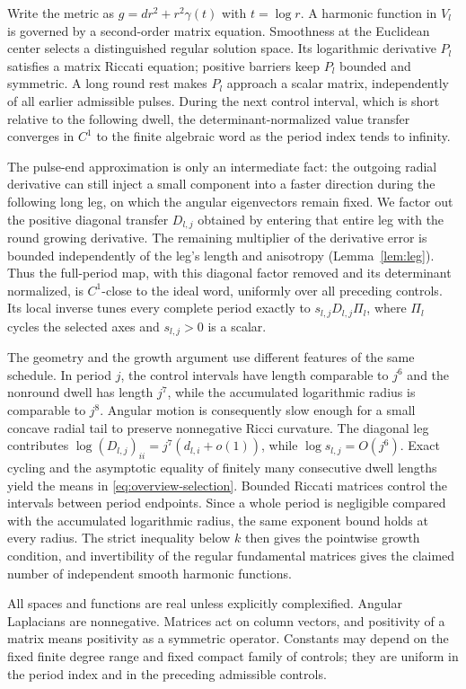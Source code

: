 Write the metric as $g=dr^2+r^2\gamma(t)$ with $t=\log r$. A harmonic
function in $V_l$ is governed by a second-order matrix equation. Smoothness
at the Euclidean center selects a distinguished regular solution space.
Its logarithmic derivative $P_l$ satisfies a matrix Riccati equation;
positive barriers keep $P_l$ bounded and symmetric. A long round rest makes
$P_l$ approach a scalar matrix, independently of all earlier admissible
pulses. During the next control interval, which is short relative to the
following dwell, the determinant-normalized value transfer converges in
$C^1$ to the finite algebraic word as the period index tends to infinity.

The pulse-end approximation is only an intermediate fact: the outgoing
radial derivative can still inject a small component into a faster direction
during the following long leg, on which the angular eigenvectors remain
fixed. We factor out the positive diagonal transfer \(D_{l,j}\) obtained by entering that entire leg with the round
growing derivative. The remaining multiplier of the derivative error is
bounded independently of the leg's length and anisotropy
(Lemma~\ref{lem:leg}). Thus the full-period map, with this diagonal
factor removed and its determinant normalized, is \(C^1\)-close to the ideal
word, uniformly over all preceding controls. Its local inverse tunes every complete period exactly to
\(s_{l,j}D_{l,j}\Pi_l\), where \(\Pi_l\) cycles the selected axes and
\(s_{l,j}>0\) is a scalar.

The geometry and the growth argument use different features of the same
schedule. In period $j$, the control intervals have length comparable to
$j^6$ and the nonround dwell has length $j^7$, while the accumulated
logarithmic radius is comparable to $j^8$. Angular motion is consequently
slow enough for a small concave radial tail to preserve nonnegative Ricci
curvature. The diagonal leg contributes
$\log(D_{l,j})_{ii}=j^7(d_{l,i}+o(1))$, while
$\log s_{l,j}=O(j^6)$. Exact cycling and the asymptotic equality of finitely
many consecutive dwell lengths yield the means in
\eqref{eq:overview-selection}. Bounded Riccati matrices control the intervals
between period endpoints. Since a whole period is negligible compared with
the accumulated logarithmic radius, the same exponent bound holds at every
radius. The strict inequality below $k$ then gives the pointwise growth
condition, and invertibility of the regular fundamental matrices gives the
claimed number of independent smooth harmonic functions.

All spaces and functions are real unless explicitly complexified. Angular
Laplacians are nonnegative. Matrices act on column vectors, and positivity of
a matrix means positivity as a symmetric operator. Constants may depend on
the fixed finite degree range and fixed compact family of controls; they are
uniform in the period index and in the preceding admissible controls.


